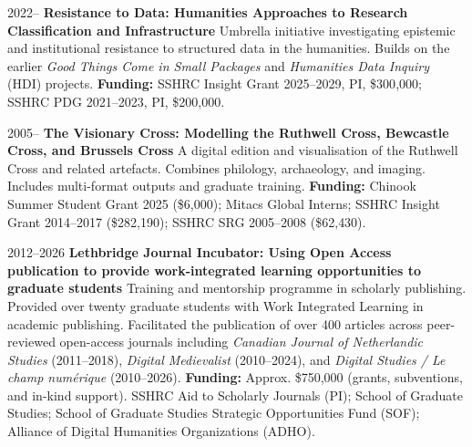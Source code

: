 \documentclass[11pt,letterpaper,sans]{moderncv}
\begin{document}
{\cventry
  {2022--}
  {\textbf{Resistance to Data: Humanities Approaches to Research Classification and Infrastructure}}
  {}
  {}
  {Umbrella initiative investigating epistemic and institutional resistance to structured data in the humanities. Builds on the earlier \textit{Good Things Come in Small Packages} and \textit{Humanities Data Inquiry} (HDI) projects.}
  {\textbf{Funding:} SSHRC Insight Grant 2025--2029, PI, \$300{,}000; SSHRC PDG 2021--2023, PI, \$200{,}000.}

\cventry
  {2005--}
  {\textbf{The Visionary Cross: Modelling the Ruthwell Cross, Bewcastle Cross, and Brussels Cross}}
  {}
  {}
  {A digital edition and visualisation of the Ruthwell Cross and related artefacts. Combines philology, archaeology, and imaging. Includes multi-format outputs and graduate training.}
  {\textbf{Funding:} Chinook Summer Student Grant 2025 (\$6{,}000); Mitacs Global Interns; SSHRC Insight Grant 2014--2017 (\$282{,}190); SSHRC SRG 2005--2008 (\$62{,}430).}

\cventry
   {2012--2026}
   {\textbf{Lethbridge Journal Incubator: Using Open Access publication to provide work-integrated learning opportunities to graduate students}}
   {}
   {}
   {Training and mentorship programme in scholarly publishing. Provided over twenty graduate students with Work Integrated Learning in academic publishing. Facilitated the publication of over 400 articles across peer-reviewed open-access journals including \textit{Canadian Journal of Netherlandic Studies} (2011–2018), \textit{Digital Medievalist} (2010--2024), and \textit{Digital Studies / Le champ numérique} (2010--2026).}
   {\textbf{Funding:} Approx. \$750,000 (grants, subventions, and in-kind support). SSHRC Aid to Scholarly Journals (PI); School of Graduate Studies; School of Graduate Studies Strategic Opportunities Fund (SOF); Alliance of Digital Humanities Organizations (ADHO).}

}
\end{document}
